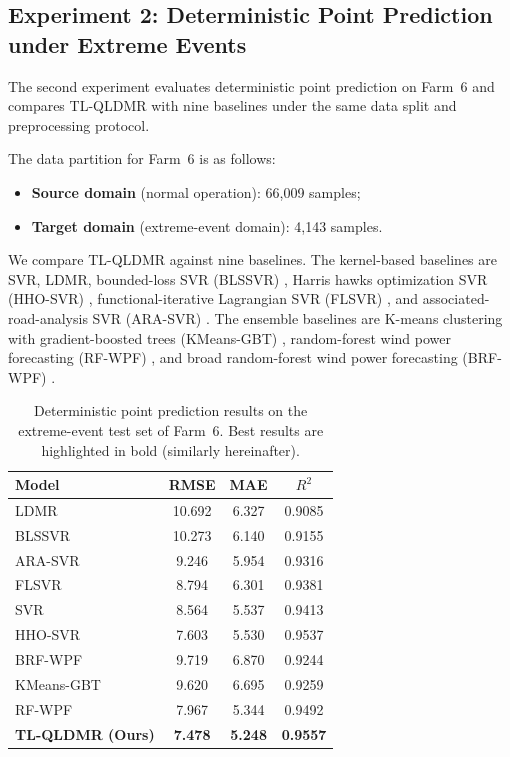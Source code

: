 \documentclass[a4paper]{cas-sc}
\begin{document}
\subsection{Experiment 2: Deterministic Point Prediction under Extreme Events}\label{sec:exp2}

The second experiment evaluates deterministic point prediction on Farm~6 and compares TL-QLDMR with nine baselines under the same data split and preprocessing protocol.

The data partition for Farm~6 is as follows:
\begin{itemize}
    \item \textbf{Source domain} (normal operation): 66{,}009 samples;
    \item \textbf{Target domain} (extreme-event domain): 4{,}143 samples.
\end{itemize}

We compare TL-QLDMR against nine baselines. The kernel-based baselines are SVR, LDMR, bounded-loss SVR (BLSSVR) \citep{fu2023bounded}, Harris hawks optimization SVR (HHO-SVR) \citep{houssein2025hho}, functional-iterative Lagrangian SVR (FLSVR) \citep{meena2025flsvr}, and associated-road-analysis SVR (ARA-SVR) \citep{duan2025ara}. The ensemble baselines are K-means clustering with gradient-boosted trees (KMeans-GBT) \citep{rizkallah2025kmeans}, random-forest wind power forecasting (RF-WPF) \citep{mustaffa2025rf}, and broad random-forest wind power forecasting (BRF-WPF) \citep{chen2025brf}.

\begin{table}[ht]
\centering
\caption{Deterministic point prediction results on the extreme-event test set of Farm~6. Best results are highlighted in bold (similarly hereinafter).}
\setlength{\tabcolsep}{3.5mm}
\begin{tabular}{lccc}
\toprule
Model & RMSE & MAE & $R^2$ \\
\midrule
LDMR & 10.692 & 6.327 & 0.9085 \\
BLSSVR        & 10.273 & 6.140 & 0.9155 \\
ARA-SVR       & 9.246 & 5.954 & 0.9316 \\
FLSVR         & 8.794 & 6.301 & 0.9381 \\
SVR  & 8.564 & 5.537 & 0.9413 \\
HHO-SVR       & 7.603 & 5.530 & 0.9537 \\
BRF-WPF       & 9.719 & 6.870 & 0.9244 \\
KMeans-GBT    & 9.620 & 6.695 & 0.9259 \\
RF-WPF        & 7.967 & 5.344 & 0.9492 \\
\textbf{TL-QLDMR (Ours)} & \textbf{7.478} & \textbf{5.248} & \textbf{0.9557} \\
\bottomrule
\end{tabular}
\label{tab:exp2_results}
\end{table}
\end{document}

